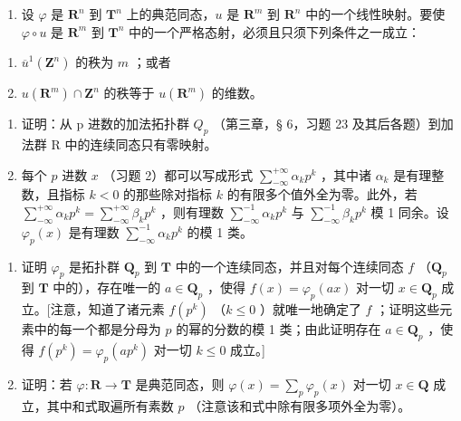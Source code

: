 \ExerciseSection

\begin{enumerate}
\def\labelenumi{\arabic{enumi})}
\tightlist
\item
  设 \(\varphi\) 是 \(\mathbf{R}^n\) 到 \(\mathbf{T}^n\) 上的典范同态，\(u\) 是 \(\mathbf{R}^m\) 到 \(\mathbf{R}^n\) 中的一个线性映射。要使 \(\varphi \circ u\) 是 \(\mathbf{R}^m\) 到 \(\mathbf{T}^n\) 中的一个严格态射，必须且只须下列条件之一成立：
\end{enumerate}

\begin{enumerate}
\def\labelenumi{\alph{enumi})}
\item
  \(\overline{u}^1 (\mathbf{Z}^n)\) 的秩为 \(m\) ；或者
\item
  \(u(\mathbf{R}^m)\cap \mathbf{Z}^n\) 的秩等于 \(u(\mathbf{R}^m)\) 的维数。
\end{enumerate}

\begin{enumerate}
\def\labelenumi{\arabic{enumi})}
\setcounter{enumi}{1}
\item
  证明：从 p 进数的加法拓扑群 \(Q_{p}\) （第三章，§ 6，习题 23 及其后各题）到加法群 R 中的连续同态只有零映射。
\item
  每个 \(p\) 进数 \(x\) （习题 2）都可以写成形式 \(\sum_{-\infty}^{+\infty} \alpha_k p^k\) ，其中诸 \(\alpha_k\) 是有理整数，且指标 \(k < 0\) 的那些除对指标 \(k\) 的有限多个值外全为零。此外，若 \(\sum_{-\infty}^{+\infty} \alpha_k p^k = \sum_{-\infty}^{+\infty} \beta_k p^k\) ，则有理数 \(\sum_{-\infty}^{-1} \alpha_k p^k\) 与 \(\sum_{-\infty}^{-1} \beta_k p^k\) 模 1 同余。设 \(\varphi_p(x)\) 是有理数 \(\sum_{-\infty}^{-1} \alpha_k p^k\) 的模 1 类。\\
\end{enumerate}

\begin{enumerate}
\def\labelenumi{\alph{enumi})}
\tightlist
\item
  证明 \(\varphi_p\) 是拓扑群 \(\mathbf{Q}_p\) 到 \(\mathbf{T}\) 中的一个连续同态，并且对每个连续同态 \(f\) （\(\mathbf{Q}_p\) 到 \(\mathbf{T}\) 中的），存在唯一的 \(a \in \mathbf{Q}_p\) ，使得 \(f(x) = \varphi_p(ax)\) 对一切 \(x \in \mathbf{Q}_p\) 成立。{[}注意，知道了诸元素 \(f(p^k)\) （\(k \leqslant 0\) ）就唯一地确定了 \(f\) ；证明这些元素中的每一个都是分母为 \(p\) 的幂的分数的模 1 类；由此证明存在 \(a \in \mathbf{Q}_p\) ，使得 \(f(p^k) = \varphi_p(ap^k)\) 对一切 \(k \leqslant 0\) 成立。{]}\\
\item
  证明：若 \(\varphi: \mathbf{R} \to \mathbf{T}\) 是典范同态，则 \(\varphi(x) = \sum_{p} \varphi_p(x)\) 对一切 \(x \in \mathbf{Q}\) 成立，其中和式取遍所有素数 \(p\) （注意该和式中除有限多项外全为零）。
\end{enumerate}

